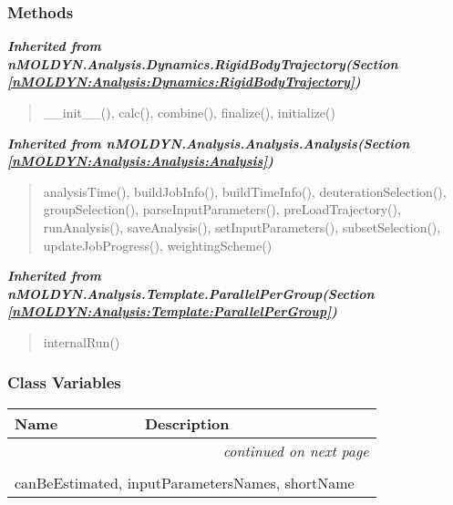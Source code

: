 
  \subsubsection{Methods}


\large{\textbf{\textit{Inherited from nMOLDYN.Analysis.Dynamics.RigidBodyTrajectory\textit{(Section \ref{nMOLDYN:Analysis:Dynamics:RigidBodyTrajectory})}}}}

\begin{quote}
\_\_init\_\_(), calc(), combine(), finalize(), initialize()
\end{quote}

\large{\textbf{\textit{Inherited from nMOLDYN.Analysis.Analysis.Analysis\textit{(Section \ref{nMOLDYN:Analysis:Analysis:Analysis})}}}}

\begin{quote}
analysisTime(), buildJobInfo(), buildTimeInfo(), deuterationSelection(), groupSelection(), parseInputParameters(), preLoadTrajectory(), runAnalysis(), saveAnalysis(), setInputParameters(), subsetSelection(), updateJobProgress(), weightingScheme()
\end{quote}

\large{\textbf{\textit{Inherited from nMOLDYN.Analysis.Template.ParallelPerGroup\textit{(Section \ref{nMOLDYN:Analysis:Template:ParallelPerGroup})}}}}

\begin{quote}
internalRun()
\end{quote}


  \subsubsection{Class Variables}

    \vspace{-1cm}
\hspace{\varindent}\begin{longtable}{|p{\varnamewidth}|p{\vardescrwidth}|l}
\cline{1-2}
\cline{1-2} \centering \textbf{Name} & \centering \textbf{Description}& \\
\cline{1-2}
\endhead\cline{1-2}\multicolumn{3}{r}{\small\textit{continued on next page}}\\\endfoot\cline{1-2}
\endlastfoot\multicolumn{2}{|l|}{\textit{Inherited from nMOLDYN.Analysis.Dynamics.RigidBodyTrajectory \textit{(Section \ref{nMOLDYN:Analysis:Dynamics:RigidBodyTrajectory})}}}\\
\multicolumn{2}{|p{\varwidth}|}{\raggedright canBeEstimated, inputParametersNames, shortName}\\
\cline{1-2}
\end{longtable}

